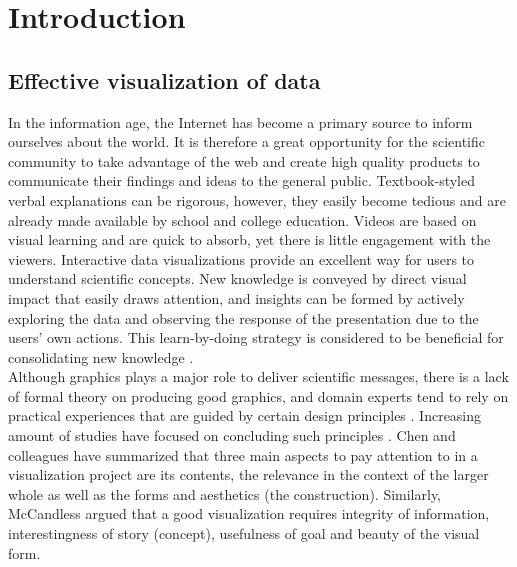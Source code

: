 \documentclass[11pt, a4paper,oneside,chapterprefix=false]{scrbook}
\begin{document}


\tableofcontents

\mainmatter


\chapter{Introduction} \label{chp:introduction}

\section{Effective visualization of data} \label{sec:one}
In the information age, the Internet has become a primary source to inform ourselves about the world. It is therefore a great opportunity for the scientific community to take advantage of the web and create high quality products to communicate their findings and ideas to the general public. Textbook-styled verbal explanations can be rigorous, however, they easily become tedious and are already made available by school and college education. Videos are based on visual learning and are quick to absorb, yet there is little engagement with the viewers. Interactive data visualizations provide an excellent way for users to understand scientific concepts. New knowledge is conveyed by direct visual impact that easily draws attention, and insights can be formed by actively exploring the data and observing the response of the presentation due to the users' own actions. This learn-by-doing strategy is considered to be beneficial for consolidating new knowledge \cite{schank1995we}. \\

Although graphics plays a major role to deliver scientific messages, there is a lack of formal theory on producing good graphics, and domain experts tend to rely on practical experiences that are guided by certain design principles \cite{chen2007handbook}. Increasing amount of studies have focused on concluding such principles \cite{senay1990rules,evergreen2013design,midway2020principles}. Chen and colleagues \cite{chen2007handbook} have summarized that three main aspects to pay attention to in a visualization project are its contents, the relevance in the context of the larger whole as well as the forms and aesthetics (the construction). Similarly, McCandless \cite{mccandless2014knowledge} argued that a good visualization requires integrity of information, interestingness of story (concept), usefulness of goal and beauty of the visual form.\\
\end{document}
